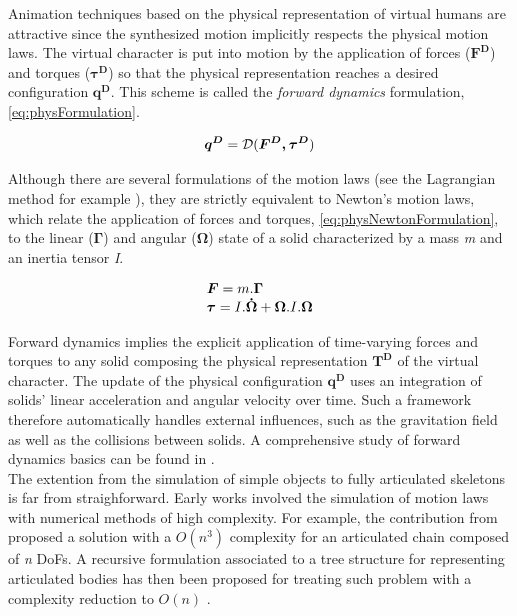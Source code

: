 Animation techniques based on the physical representation of virtual humans are attractive since the synthesized motion implicitly respects the physical motion laws. The virtual character is put into motion by the application of forces ($\boldsymbol{F^D}$) and torques ($\boldsymbol{\tau^D}$) so that the physical representation reaches a desired configuration $\boldsymbol{q^D}$. This scheme is called the \emph{forward dynamics} formulation, \myequname \eqref{eq:physFormulation}.

\begin{equation}
	\boldsymbol{q^D} = \mathcal{D}(\boldsymbol{F^D, \tau^D})
\label{eq:physFormulation}
\eqcaption{Forward dynamics formulation}
\end{equation}

Although there are several formulations of the motion laws (see the Lagrangian method for example ), they are strictly equivalent to Newton's motion laws, which relate the application of forces and torques, \myequname \eqref{eq:physNewtonFormulation},  to the linear ($\boldsymbol{\Gamma}$) and angular ($\boldsymbol{\Omega}$) state of a solid characterized by a mass \emph{m} and an inertia tensor \emph{I}.

\begin{equation}
	\begin{array}{l}
		\boldsymbol{F} = m . \boldsymbol{\Gamma} \\
		\boldsymbol{\tau} = I . \boldsymbol{\dot{\Omega}} + \boldsymbol{\Omega}.I.\boldsymbol{\Omega}
	\end{array}
\label{eq:physNewtonFormulation}
\eqcaption{Newton motion laws}
\end{equation}


				\label{subsubsubsec:CA_MC_Physics_Fwd}
				
Forward dynamics implies the explicit application of time-varying forces and torques to any solid composing the physical representation $\boldsymbol{T^D}$ of the virtual character. The update of the physical configuration $\boldsymbol{q^D}$ uses an integration of solids' linear acceleration and angular velocity over time. Such a framework therefore automatically handles external influences, such as the gravitation field as well as the collisions between solids. A comprehensive study of forward dynamics basics can be found in .\\

The extention from the simulation of simple objects to fully articulated skeletons is far from straighforward. Early works involved the simulation of motion laws with numerical methods of high complexity. For example, the contribution from  proposed a solution with a $O(n^3)$ complexity for an articulated chain composed of \emph{n} DoFs. A recursive formulation associated to a tree structure for representing articulated bodies has then been proposed for treating such problem with a complexity reduction to $O(n)$ .\\

